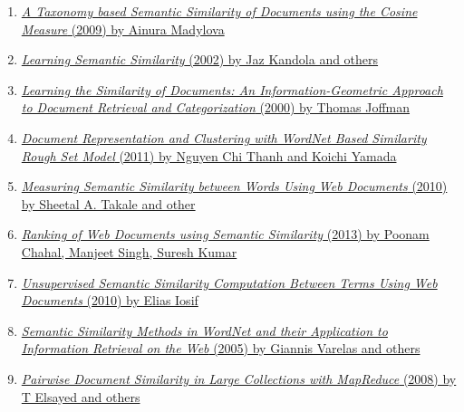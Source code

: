 \documentclass[12pt]{article}
\begin{document}
\begin{framed}
\begin{enumerate}
\item \href{https://github.com/nmonath/NLPProject/blob/master/research/papers/A\%20Taxonomy\%20based\%20Semantic\%20Similarity.pdf}{\emph{A Taxonomy based Semantic Similarity of
Documents using the Cosine Measure} (2009) by Ainura Madylova}

\item \href{https://github.com/nmonath/NLPProject/blob/master/research/papers/AA22.pdf}{\emph{Learning Semantic Similarity} (2002) by Jaz Kandola and others}

\item \href{https://github.com/nmonath/NLPProject/blob/master/research/papers/Hofmann-NIPS99.pdf}{\emph{Learning the Similarity of Documents:
An Information-Geometric Approach to
Document Retrieval and Categorization} (2000) by Thomas Joffman}

\item \href{https://github.com/nmonath/NLPProject/blob/master/research/papers/IJCSI-8-5-3-1-8.pdf}{\emph{Document Representation and Clustering with WordNet Based Similarity Rough Set Model} (2011) by Nguyen Chi Thanh and Koichi Yamada}

\item \href{https://github.com/nmonath/NLPProject/blob/master/research/papers/Paper\%2014-Measuring\%20Semantic\%20Similarity\%20Between\%20Words\%20Using\%20Web\%20Documents.pdf}{\emph{Measuring Semantic Similarity between Words
Using Web Documents} (2010) by Sheetal A. Takale and other}

\item \href{https://github.com/nmonath/NLPProject/blob/master/research/papers/RankingofWebDocuments.pdf}{\emph{Ranking of Web Documents using Semantic
Similarity} (2013) by Poonam Chahal, Manjeet Singh, Suresh Kumar}

\item \href{https://github.com/nmonath/NLPProject/blob/master/research/papers/Unsupervised\%20Semantic\%20Similarity.pdf}{\emph{Unsupervised Semantic Similarity Computation
Between Terms Using Web Documents} (2010) by Elias Iosif}

\item \href{https://github.com/nmonath/NLPProject/blob/master/research/papers/Varelas-widm05.pdf}{\emph{Semantic Similarity Methods in WordNet and their
Application to Information Retrieval on the Web} (2005) by Giannis Varelas and others}

\item \href{https://github.com/nmonath/NLPProject/blob/master/research/papers/docsim.pdf}{\emph{Pairwise Document Similarity in Large Collections with MapReduce} (2008) by T Elsayed and others}


\end{enumerate}
\end{framed}
\end{document}
